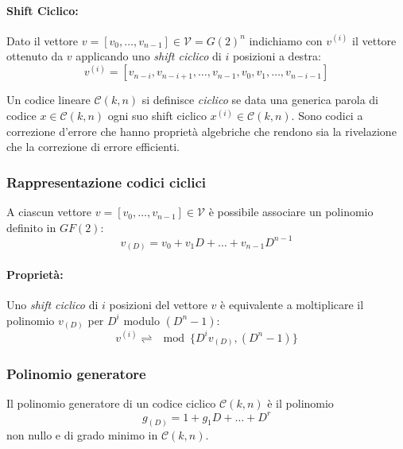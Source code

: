         \paragraph{Shift Ciclico:}
            \begin{sloppypar}
                Dato il vettore ${v = [v_0,\dots,v_{n-1}]\in \mathcal{V} = G(2)^n}$ indichiamo con $v^{(i)}$ il vettore ottenuto da $v$ applicando uno 
                \emph{shift ciclico} di $i$ posizioni a destra:
                \[
                    v^{(i)} = [v_{n-i},v_{n-i+1}, \dots, v_{n-1},v_0,v_1,\dots, v_{n-i-1}]    
                \]     
            \end{sloppypar}
            Un codice lineare $\mathcal{C}(k,n)$ si definisce \emph{ciclico} se data una generica parola di codice $x\in \mathcal{C}(k,n)$ ogni suo
            shift ciclico $x^{(i)}\in \mathcal{C}(k,n)$. Sono codici a correzione d'errore che hanno proprietà algebriche che rendono sia la rivelazione che la correzione
            di errore efficienti.
        \subsubsection{Rappresentazione codici ciclici}
            A ciascun vettore $v = [v_0,\dots,v_{n-1}]\in \mathcal{V}$ è possibile associare un polinomio definito in $GF(2)$:
            \[
                v_{(D)} = v_0 + v_1 D+\dots+ v_{n-1}D^{n-1}    
            \]
            \paragraph{Proprietà:} Uno \emph{shift ciclico} di $i$ posizioni del vettore $v$ è equivalente a moltiplicare
            il polinomio $v_{(D)}$ per $D^i$ modulo $(D^n-1)$:
            \[
                v^{(i)} \rightleftharpoons \mod\{D^iv_{(D)},(D^n-1)\}    
            \]
        \subsubsection{Polinomio generatore}
            Il polinomio generatore di un codice ciclico $\mathcal{C}(k,n)$ è il polinomio
            \[
                g_{(D)} = 1+g_1D+ \dots + D^r    
            \]
            non nullo e di grado minimo in $\mathcal{C}(k,n)$.

